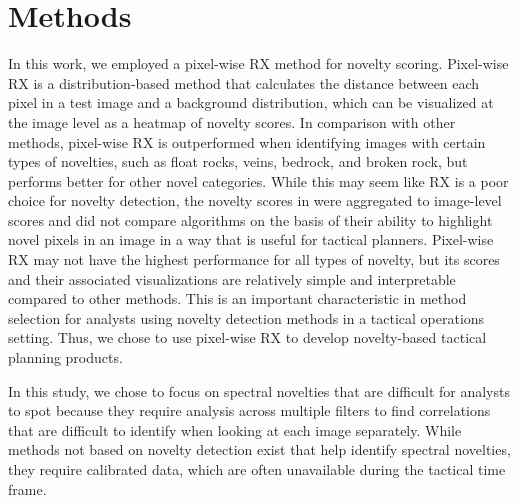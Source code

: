 \section{Methods}
In this work, we employed a pixel-wise RX method for novelty scoring.
Pixel-wise RX is a distribution-based method that calculates the distance between each pixel in a test image and a background distribution, which can be visualized at the image level as a heatmap of novelty scores. 
In comparison with other methods, pixel-wise RX is outperformed when identifying images with certain types of novelties, such as float rocks, veins, bedrock, and broken rock, but performs better for other novel categories. 
While this may seem like RX is a poor choice for novelty detection, the novelty scores in \cite{kerner2020comparison} were aggregated to image-level scores and did not compare algorithms on the basis of their ability to highlight novel pixels in an image in a way that is useful for tactical planners. 
Pixel-wise RX may not have the highest performance for all types of novelty, but its scores and their associated visualizations are relatively simple and interpretable compared to other methods. 
This is an important characteristic in method selection for analysts using novelty detection methods in a tactical operations setting. Thus, we chose to use pixel-wise RX to develop novelty-based tactical planning products. 

In this study, we chose to focus on spectral novelties that are difficult for analysts to spot because they require analysis across multiple filters to find correlations that are difficult to identify when looking at each image separately. 
While methods not based on novelty detection exist that help identify spectral novelties, they require calibrated data, which are often unavailable during the tactical time frame. 

